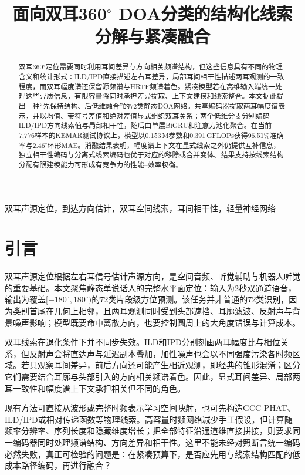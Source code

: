 \documentclass{article}
\title{面向双耳360$^\circ$ DOA分类的结构化线索分解与紧凑融合}
\begin{document}
\ninept
\maketitle

\begin{abstract}
双耳360$^\circ$定位需要同时利用耳间差异与方向相关频谱结构，但这些信息具有不同的物理含义和统计形式：ILD/IPD直接描述左右耳差异，局部耳间相干性描述两耳观测的一致程度，而双耳幅度谱还保留源频谱与HRTF频谱着色。紧凑模型若在高维输入端统一处理这些异质信息，有限容量将同时承担差异提取、上下文建模和线索整合。本文据此提出一种“先保持结构、后低维融合”的72类静态DOA网络。共享编码器提取两耳幅度谱表示，并以均值、带符号差值和绝对差值显式组织双耳关系；两个低维分支分别编码ILD/IPD方向线索值与局部相干性，随后由单层BiGRU和注意力池化聚合。在当前7,776样本的KEMAR测试协议上，模型以$0.153\,\mathrm{M}$参数和$0.391\,\mathrm{GFLOPs}$获得96.51\%准确率与2.46$^\circ$环形MAE。消融结果表明，幅度谱上下文在显式线索之外仍提供互补信息，独立相干性编码与分离式线索编码也优于对应的移除或合并变体。结果支持按线索结构分配有限建模能力可形成有竞争力的性能--效率权衡。
\end{abstract}

\begin{keywords}
双耳声源定位，到达方向估计，双耳空间线索，耳间相干性，轻量神经网络
\end{keywords}

\section{引言}
\label{sec:intro}

双耳声源定位根据左右耳信号估计声源方向，是空间音频、听觉辅助与机器人听觉的重要基础。本文聚焦静态单说话人的完整水平面定位：输入为2秒双通道语音，输出为覆盖$[-180^\circ,180^\circ)$的72类片段级方位预测。该任务并非普通的72类识别，因为类别首尾在几何上相邻，且两耳观测同时受到头部遮挡、耳廓滤波、反射声与背景噪声影响；模型既要命中离散方向，也要控制圆周上的大角度错误与计算成本。

双耳线索在退化条件下并不同步失效。ILD和IPD分别刻画两耳幅度比与相位关系，但反射声会将直达声与延迟副本叠加，加性噪声也会以不同强度污染各时频区域\cite{blauert1997,may2011}。若只观察耳间差异，前后方向还可能产生相近观测，即经典的锥形混淆；区分它们需要结合耳廓与头部引入的方向相关频谱着色\cite{blauert1997}。因此，显式耳间差异、局部两耳一致性和幅度谱上下文承担相关但不同的角色。

现有方法可直接从波形或完整时频表示学习空间映射\cite{vecchiotti2019}，也可先构造GCC-PHAT、ILD/IPD或相对传递函数等物理线索\cite{knapp1976,tokala2025}。高容量时频网络减少手工假设，但计算随频率分辨率、序列长度和隐藏维度增长；把全部特征沿通道维直接拼接，则要求同一编码器同时处理频谱结构、方向差异和相干性。这里不能未经对照断言统一编码必然失败，真正可检验的问题是：在紧凑预算下，是否应先用与线索结构匹配的低成本路径编码，再进行融合？
\end{document}
